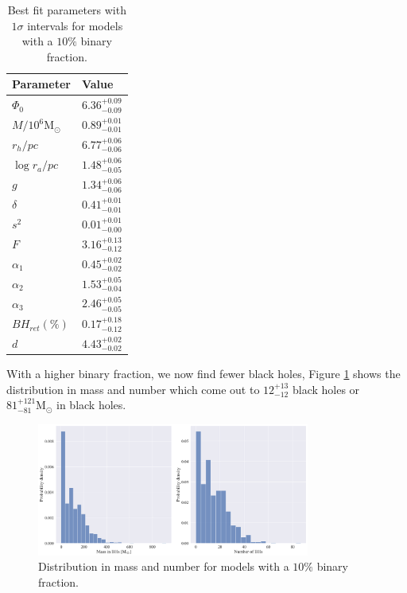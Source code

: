 \begin{table}
	\centering
	\caption{Best fit parameters with $1\sigma$ intervals for models with a $10\%$ binary fraction.}
	\begin{tabular}{l l}

		\hline
		Parameter                 & Value                  \\
		\hline
		$\Phi_0$                  & $6.36^{+0.09}_{-0.09}$ \\
		$M/10^6 \mathrm{M}_\odot$ & $0.89^{+0.01}_{-0.01}$ \\
		$r_h / pc$                & $6.77^{+0.06}_{-0.06}$ \\
		$\log{r_a / pc}$          & $1.48^{+0.06}_{-0.05}$ \\
		$g$                       & $1.34^{+0.06}_{-0.06}$ \\
		$\delta$                  & $0.41^{+0.01}_{-0.01}$ \\
		$s^2$                     & $0.01^{+0.01}_{-0.00}$ \\
		$F$                       & $3.16^{+0.13}_{-0.12}$ \\
		$\alpha_1$                & $0.45^{+0.02}_{-0.02}$ \\
		$\alpha_2$                & $1.53^{+0.05}_{-0.04}$ \\
		$\alpha_3$                & $2.46^{+0.05}_{-0.05}$ \\
		$BH_{ret} (\%)$           & $0.17^{+0.18}_{-0.12}$ \\
		$d$                       & $4.43^{+0.02}_{-0.02}$ \\
		\hline
	\end{tabular}
	\label{tab:parameters_highbin}
\end{table}

With a higher binary fraction, we now find fewer black holes, Figure
\ref{fig:high_bin_model_BH_dists} shows the distribution in mass and number which come out to
$12^{+13}_{-12}$ black holes or $81 ^{+121}_{-81} \mathrm{M}_\odot$ in black holes.


\begin{figure}
	\centering
	\includegraphics[width=0.8\textwidth]{figures/high_bin_model/BH_dists.png}
	\caption{Distribution in mass and number for models with a $10\%$ binary fraction.}
	\label{fig:high_bin_model_BH_dists}
\end{figure}


